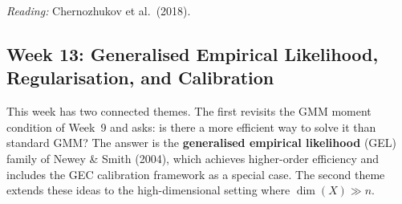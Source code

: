 \documentclass[12pt]{article}
\begin{document}
\noindent\textit{Reading:} Chernozhukov et al.\ (2018).

\subsection{Week 13: Generalised Empirical Likelihood, Regularisation,
  and Calibration}

This week has two connected themes.  The first revisits the GMM moment
condition of Week~9 and asks: is there a more efficient way to solve it
than standard GMM?  The answer is the \textbf{generalised empirical
likelihood} (GEL) family of Newey \& Smith (2004), which achieves higher-order
efficiency and includes the GEC calibration framework as a special case.
The second theme extends these ideas to the high-dimensional setting
where $\dim(X) \gg n$.
\end{document}
